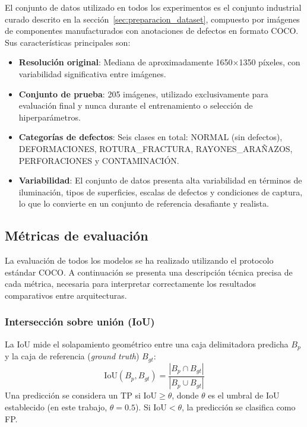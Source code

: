 El conjunto de datos utilizado en todos los experimentos es el conjunto industrial curado descrito en la sección~\ref{sec:preparacion_dataset}, compuesto por imágenes de componentes manufacturados con anotaciones de defectos en formato COCO. Sus características principales son:

\begin{itemize}
    \item \textbf{Resolución original}: Mediana de aproximadamente 1650×1350 píxeles, con variabilidad significativa entre imágenes.
    \item \textbf{Conjunto de prueba}: 205 imágenes, utilizado exclusivamente para evaluación final y nunca durante el entrenamiento o selección de hiperparámetros.
    \item \textbf{Categorías de defectos}: Seis clases en total: NORMAL (sin defectos), DEFORMACIONES, \mbox{ROTURA\_FRACTURA}, \mbox{RAYONES\_ARAÑAZOS}, PERFORACIONES y CONTAMINACIÓN.
    \item \textbf{Variabilidad}: El conjunto de datos presenta alta variabilidad en términos de iluminación, tipos de superficies, escalas de defectos y condiciones de captura, lo que lo convierte en un conjunto de referencia desafiante y realista.
\end{itemize}

\subsection{Métricas de evaluación}
\label{subsec:metricas}

La evaluación de todos los modelos se ha realizado utilizando el protocolo estándar COCO. A continuación se presenta una descripción técnica precisa de cada métrica, necesaria para interpretar correctamente los resultados comparativos entre arquitecturas.

\subsubsection{Intersección sobre unión (IoU)}

La \acrfull{IoU} mide el solapamiento geométrico entre una caja delimitadora predicha $B_p$ y la caja de referencia (\textit{ground truth}) $B_{gt}$:
\begin{equation}
\text{IoU}(B_p, B_{gt}) = \frac{|B_p \cap B_{gt}|}{|B_p \cup B_{gt}|}
\label{eq:iou}
\end{equation}
Una predicción se considera un \acrfull{TP} si $\text{IoU} \geq \theta$, donde $\theta$ es el umbral de IoU establecido (en este trabajo, $\theta = 0.5$). Si $\text{IoU} < \theta$, la predicción se clasifica como \acrfull{FP}.

